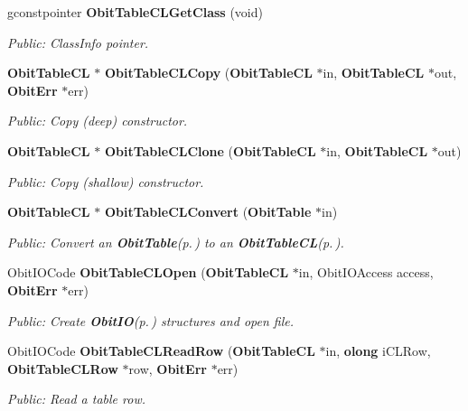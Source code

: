 \begin{CompactItemize}
gconstpointer {\bf Obit\-Table\-CLGet\-Class} (void)
\begin{CompactList}\small\item\em Public: Class\-Info pointer. \item\end{CompactList}\item 
{\bf Obit\-Table\-CL} $\ast$ {\bf Obit\-Table\-CLCopy} ({\bf Obit\-Table\-CL} $\ast$in, {\bf Obit\-Table\-CL} $\ast$out, {\bf Obit\-Err} $\ast$err)
\begin{CompactList}\small\item\em Public: Copy (deep) constructor. \item\end{CompactList}\item 
{\bf Obit\-Table\-CL} $\ast$ {\bf Obit\-Table\-CLClone} ({\bf Obit\-Table\-CL} $\ast$in, {\bf Obit\-Table\-CL} $\ast$out)
\begin{CompactList}\small\item\em Public: Copy (shallow) constructor. \item\end{CompactList}\item 
{\bf Obit\-Table\-CL} $\ast$ {\bf Obit\-Table\-CLConvert} ({\bf Obit\-Table} $\ast$in)
\begin{CompactList}\small\item\em Public: Convert an {\bf Obit\-Table}{\rm (p.\,\pageref{structObitTable})} to an {\bf Obit\-Table\-CL}{\rm (p.\,\pageref{structObitTableCL})}. \item\end{CompactList}\item 
Obit\-IOCode {\bf Obit\-Table\-CLOpen} ({\bf Obit\-Table\-CL} $\ast$in, Obit\-IOAccess access, {\bf Obit\-Err} $\ast$err)
\begin{CompactList}\small\item\em Public: Create {\bf Obit\-IO}{\rm (p.\,\pageref{structObitIO})} structures and open file. \item\end{CompactList}\item 
Obit\-IOCode {\bf Obit\-Table\-CLRead\-Row} ({\bf Obit\-Table\-CL} $\ast$in, {\bf olong} i\-CLRow, {\bf Obit\-Table\-CLRow} $\ast$row, {\bf Obit\-Err} $\ast$err)
\begin{CompactList}\small\item\em Public: Read a table row. \item\end{CompactList}\item 

\end{CompactItemize}

